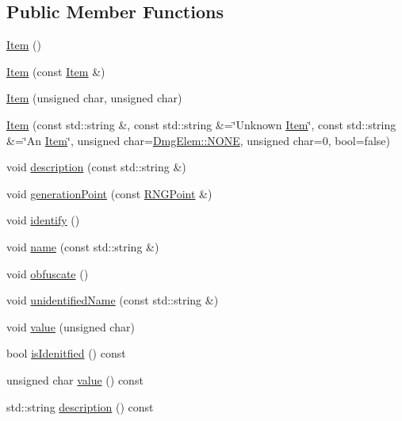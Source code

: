 \subsection*{Public Member Functions}
\begin{DoxyCompactItemize}
\item 
\hyperlink{class_flow_1_1_item_a5ceb9782e3bcecad6e897205555a2fd2}{Item} ()
\item 
\hyperlink{class_flow_1_1_item_afd155cd633c9271deccc3a64a92ef8a6}{Item} (const \hyperlink{class_flow_1_1_item}{Item} \&)
\item 
\hyperlink{class_flow_1_1_item_a7a4c9046f26096192a8df5cda0f1ce79}{Item} (unsigned char, unsigned char)
\item 
\hyperlink{class_flow_1_1_item_a69ddfc7a600d8a66a4b6a045f149ce6a}{Item} (const std\+::string \&, const std\+::string \&=\char`\"{}Unknown \hyperlink{class_flow_1_1_item}{Item}\char`\"{}, const std\+::string \&=\char`\"{}An \hyperlink{class_flow_1_1_item}{Item}\char`\"{}, unsigned char=\hyperlink{namespace_flow_1_1_dmg_elem_a2c7180f371963927ddcc5b333568a33b}{Dmg\+Elem\+::\+N\+O\+NE}, unsigned char=0, bool=false)
\item 
void \hyperlink{class_flow_1_1_item_a479edd419531aa2db9f707efac66fa7b}{description} (const std\+::string \&)
\item 
void \hyperlink{class_flow_1_1_item_a0cde312c43e4807d994a84aa28711629}{generation\+Point} (const \hyperlink{struct_flow_1_1_r_n_g_point}{R\+N\+G\+Point} \&)
\item 
void \hyperlink{class_flow_1_1_item_aad72c7a574fa3ab77a4a01f0f7be8589}{identify} ()
\item 
void \hyperlink{class_flow_1_1_item_a1e8fe7af2c547994e93bf1cbc3289908}{name} (const std\+::string \&)
\item 
void \hyperlink{class_flow_1_1_item_a75302c9fecaeef01b9dabde3a0861f8c}{obfuscate} ()
\item 
void \hyperlink{class_flow_1_1_item_afe1b907ce55b03b7011a694aedf1f1f9}{unidentified\+Name} (const std\+::string \&)
\item 
void \hyperlink{class_flow_1_1_item_a0c903b70ce7ddd19ee2c117de443bc30}{value} (unsigned char)
\item 
bool \hyperlink{class_flow_1_1_item_ad87cbf57ff2a9ff9f141af741e5755e5}{is\+Idenitfied} () const
\item 
unsigned char \hyperlink{class_flow_1_1_item_af475c6f792312b9ad95dae06b6cb29b6}{value} () const
\item 
std\+::string \hyperlink{class_flow_1_1_item_ade8afa150cf8f2b97ce7de8cfbc4f1df}{description} () const

\end{DoxyCompactItemize}
